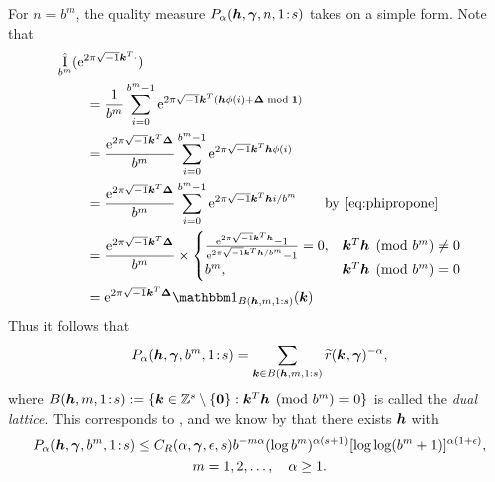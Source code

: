 \documentclass{iitthesis-au} %
\newcommand{\tr}{\widetilde{r}}
\DeclareMathOperator{\appxint}{\hat{I}}
\newcommand{\onetos}{1\!:\!s}
\begin{document}
For $n = b^m$, the quality measure $P_\alpha(\vh,\vgamma,n,\onetos)$ takes on a simple form.  Note that
\begin{align}\label{Eq:DualLattice}
    \MoveEqLeft{\appxint_{b^m}(\me^{2 \pi \sqrt{-1} \vk^T \cdot})} \\
    \nonumber
    &= \frac 1{b^m} \sum_{i=0}^{b^m-1} \me^{2 \pi \sqrt{-1} \vk^T (\vh\phi(i) + \vDelta \bmod{\vone})} \\
    \nonumber
    &= \frac {\me^{2 \pi \sqrt{-1} \vk^T \vDelta}}{b^m} \sum_{i=0}^{b^m-1} \me^{2 \pi \sqrt{-1} \vk^T \vh\phi(i)} \\
    \nonumber
    &= \frac {\me^{2 \pi \sqrt{-1} \vk^T \vDelta}}{b^m} \sum_{i=0}^{b^m-1} \me^{2 \pi \sqrt{-1} \vk^T \vh i/b^m} \qquad \text{by \eqref{eq:phipropone}}\\
    \nonumber
    &= \frac {\me^{2 \pi \sqrt{-1} \vk^T \vDelta}}{b^m} \times
    \begin{cases}
    \frac{\me^{2 \pi \sqrt{-1} \vk^T \vh} - 1}{\me^{2 \pi \sqrt{-1} \vk^T \vh/b^m} - 1} = 0, & \vk^T \vh \pmod{b^m} \ne 0\\
    b^m, & \vk^T \vh \pmod{b^m} = 0
    \end{cases} \\
    \nonumber
    & = \me^{2 \pi \sqrt{-1} \vk^T \vDelta} \bbone_{B(\vh,m,1:s)}(\vk)
\end{align}
Thus it follows that
\begin{equation} \label{eq:Palphadual}
    P_\alpha(\vh,\vgamma,b^m,\onetos) = \sum_{\vk \in B(\vh,m,1:s)} \tr(\vk,\vgamma)^{-\alpha},
\end{equation}
where $B(\vh,m,\onetos) : = \{\vk \in  \integers^s \setminus \{\vzero\} : \vk^T \vh \pmod{b^m} = 0\}$ is called the \emph{dual lattice}.  This corresponds to \cite[Equation (3)]{HicNie03a}, and we know by \cite[Theorem 5]{HicNie03a} that  there exists $\boldsymbol{h}$ with
\begin{multline} \label{eq:Niedbd}
    P_{\alpha}(\vh,\vgamma,b^m,\onetos) \le C_{R}(\alpha,\vgamma,\epsilon,s)
    b^{-m\alpha} (\log b^{m})^{\alpha(s+1)} [\log \log (
    b^m+1)]^{\alpha(1+\epsilon)}, \\ m = 1, 2,\ldots, \quad \alpha \ge 1.
\end{multline}
\end{document}
